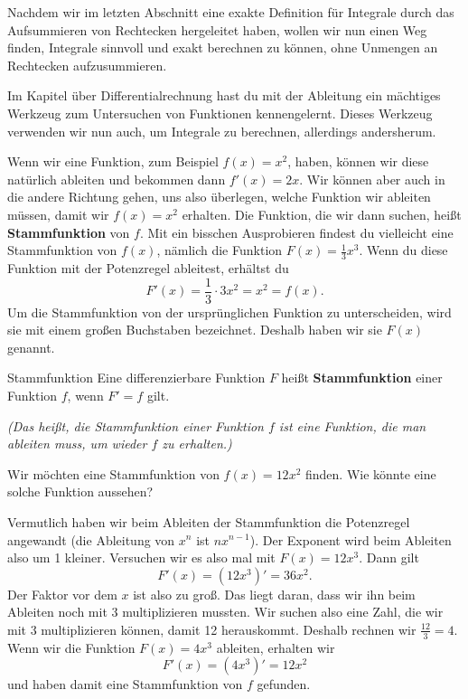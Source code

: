 \documentclass[../../main.tex]{subfiles}
\begin{document}
Nachdem wir im letzten Abschnitt eine exakte Definition für Integrale durch das Aufsummieren von Rechtecken hergeleitet 
haben, wollen wir nun einen Weg finden, Integrale sinnvoll und exakt berechnen zu können, ohne Unmengen an Rechtecken
aufzusummieren.

Im Kapitel über Differentialrechnung hast du mit der Ableitung ein mächtiges Werkzeug zum Untersuchen von Funktionen
kennengelernt. Dieses Werkzeug verwenden wir nun auch, um Integrale zu berechnen, allerdings andersherum. 

Wenn wir eine Funktion, zum Beispiel $f(x)=x^2$, haben, können wir diese natürlich ableiten und bekommen dann $f'(x)=2x$. Wir können
aber auch in die andere Richtung gehen, uns also überlegen, welche Funktion wir ableiten müssen, damit wir $f(x)=x^2$ 
erhalten. Die Funktion, die wir dann suchen, heißt \textbf{Stammfunktion} von $f$. Mit ein bisschen Ausprobieren findest
du vielleicht eine Stammfunktion von $f(x)$, nämlich die Funktion $F(x)=\frac{1}{3}x^3$. Wenn du diese Funktion mit der
Potenzregel ableitest, erhältst du
\[F'(x)=\frac{1}{3}\cdot 3x^2=x^2=f(x).\]
Um die Stammfunktion von der ursprünglichen Funktion zu unterscheiden, wird sie mit einem großen Buchstaben bezeichnet.
Deshalb haben wir sie $F(x)$ genannt.
\begin{definition}{Stammfunktion}
    Eine differenzierbare Funktion $F$ heißt \textbf{Stammfunktion} einer Funktion $f$, wenn  $F'=f$ gilt. 

    \emph{(Das heißt, die Stammfunktion einer Funktion $f$ ist eine Funktion, die man ableiten muss, um wieder $f$ zu erhalten.)}
\end{definition}
\begin{example}{}
    Wir möchten eine Stammfunktion von $f(x)=12x^2$ finden. Wie könnte eine solche Funktion aussehen?

    Vermutlich haben wir beim Ableiten der Stammfunktion die Potenzregel angewandt (die Ableitung von $x^n$ ist 
    $nx^{n-1}$). Der Exponent wird beim Ableiten also um 1 kleiner. Versuchen wir es also mal mit $F(x)=12x^3$. Dann gilt
    \[F'(x)=(12x^3)'=36x^2.\]
    Der Faktor vor dem $x$ ist also zu groß. Das liegt daran, dass wir ihn beim Ableiten noch mit 3 multiplizieren mussten.
    Wir suchen also eine Zahl, die wir mit 3 multiplizieren können, damit 12 herauskommt. Deshalb rechnen wir 
    $\frac{12}{3}=4$. Wenn wir die Funktion $F(x)=4x^3$ ableiten, erhalten wir
    \[F'(x)=(4x^3)'=12x^2\]
    und haben damit eine Stammfunktion von $f$ gefunden.
\end{example}
\end{document}
